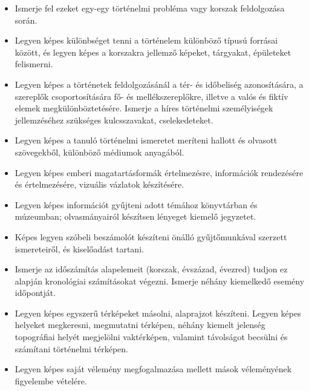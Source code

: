 \begin{itemize}
\item Ismerje fel ezeket egy-egy történelmi probléma vagy korszak feldolgozása során.
\item Legyen képes különbséget tenni a történelem különböző típusú forrásai között, és legyen képes a korszakra jellemző képeket, tárgyakat, épületeket felismerni.
\item Legyen képes a történetek feldolgozásánál a tér- és időbeliség azonosítására, a szereplők csoportosítására fő- és mellékszereplőkre, illetve a valós és fiktív elemek megkülönböztetésére. Ismerje a híres történelmi személyiségek jellemzéséhez szükséges kulcsszavakat, cselekedeteket.
\item Legyen képes a tanuló történelmi ismeretet meríteni hallott és olvasott szövegekből, különböző médiumok anyagából.
\item Legyen képes emberi magatartásformák értelmezésre, információk rendezésére és értelmezésére, vizuális vázlatok készítésére.
\item Legyen képes információt gyűjteni adott témához könyvtárban és múzeumban; olvasmányairól készítsen lényeget kiemelő jegyzetet.
\item Képes legyen szóbeli beszámolót készíteni önálló gyűjtőmunkával szerzett ismereteiről, és kiselőadást tartani.
\item Ismerje az időszámítás alapelemeit (korszak, évszázad, évezred) tudjon ez alapján kronológiai számításokat végezni. Ismerje néhány kiemelkedő esemény időpontját.
\item Legyen képes egyszerű térképeket másolni, alaprajzot készíteni. Legyen képes helyeket megkeresni, megmutatni térképen, néhány kiemelt jelenség topográfiai helyét megjelölni vaktérképen, valamint távolságot becsülni és számítani történelmi térképen.
\item Legyen képes saját vélemény megfogalmazása mellett mások véleményének figyelembe vételére.
\end{itemize}
